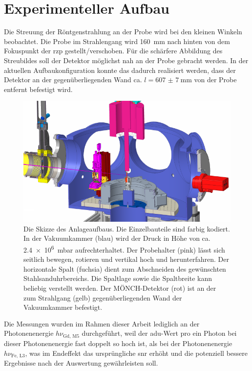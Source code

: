 \chapter{Experimenteller Aufbau}
Die Streuung der Röntgenstrahlung an der Probe wird bei den kleinen Winkeln beobachtet. Die Probe im Strahlengang wird \SI{160}{\milli\meter} nach hinten von dem Fokuspunkt der \gls{rzp} gestellt/verschoben. Für die schärfere Abbildung des Streubildes soll der Detektor möglichst nah an der Probe gebracht werden. In der aktuellen Aufbaukonfiguration konnte das dadurch realisiert werden, dass der Detektor an der gegenüberliegenden Wand ca. $l = \SI{607(7)}{\milli\meter}$ von der Probe entfernt befestigt wird.
\begin{figure}[H]
    \centering
    \includegraphics{images/aufbau/aufbau_empty.pdf}
    \caption{Die Skizze des Anlageaufbaus. Die Einzelbauteile sind farbig kodiert. In der Vakuumkammer (blau) wird der Druck in Höhe von ca. \SI{2.4e6}{\milli\bar} aufrechterhaltet. Der Probehalter (pink) lässt sich seitlich bewegen, rotieren und vertikal hoch und herunterfahren. Der horizontale Spalt (fuchsia) dient zum Abschneiden des gewünschten Stahlsanduhrbereichs. Die Spaltlage sowie die Spaltbreite kann beliebig verstellt werden. Der MÖNCH-Detektor (rot) ist an der zum Strahlgang (gelb) gegenüberliegenden Wand der Vakuumkammer befestigt.}
    \label{fig:anlage}
\end{figure}
\noindent
Die Messungen wurden im Rahmen dieser Arbeit lediglich an der Photonenenergie $h\nu_\text{Gd, M5}$ durchgeführt, weil der \gls{adu}-Wert pro ein Photon bei dieser Photonenenergie fast doppelt so hoch ist, als bei der Photonenenergie $h\nu_\text{Fe, L3}$, was im Endeffekt das ursprüngliche \gls{snr} erhöht und die potenziell bessere Ergebnisse nach der Auswertung gewährleisten soll.


